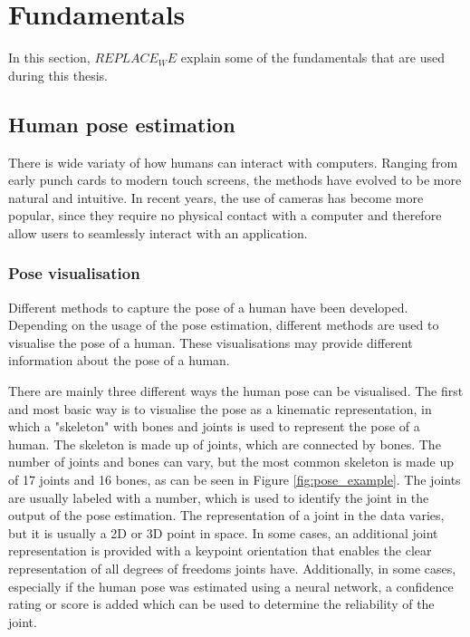 \section{Fundamentals}

In this section, $REPLACE_WE$ explain some of the fundamentals that are used during this thesis. 

\subsection{Human pose estimation}

There is wide variaty of how humans can interact with computers. Ranging from early punch cards to modern touch screens, the methods have evolved to be more natural and intuitive. In recent years, the use of cameras has become more popular, since they require no physical contact with a computer and therefore allow users to seamlessly interact with an application.

\subsubsection{Pose visualisation}

Different methods to capture the pose of a human have been developed. Depending on the usage of the pose estimation, different methods are used to visualise the pose of a human. These visualisations may provide different information about the pose of a human.

There are mainly three different ways the human pose can be visualised. The first and most basic way is to visualise the pose as a kinematic representation, in which a "skeleton" with bones and joints is used to represent the pose of a human. The skeleton is made up of joints, which are connected by bones. The number of joints and bones can vary, but the most common skeleton is made up of 17 joints and 16 bones, as can be seen in Figure \ref{fig:pose_example}. The joints are usually labeled with a number, which is used to identify the joint in the output of the pose estimation. The representation of a joint in the data varies, but it is usually a 2D or 3D point in space. In some cases, an additional joint representation is provided with a keypoint orientation that enables the clear representation of all degrees of freedoms joints have\cite{KeypointOrientation}. Additionally, in some cases, especially if the human pose was estimated using a neural network, a confidence rating or score is added which can be used to determine the reliability of the joint.

